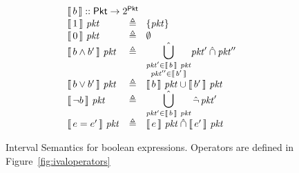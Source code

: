 \begin{figure}
  \[
    \begin{array}{lcl}
      \multicolumn 3 l {\bracbb{b} :: \Pkt \to 2^\Pkt} \\
      \bracbb{1}~\pkt &\triangleq& \{\pkt\}\\
      \bracbb{0}~\pkt & \triangleq & \emptyset \\
      \bracbb{b \wedge b'}~\pkt &\triangleq & \displaystyle \hat{\bigcup_{\substack{\pkt' \in \bracbb{b}~\pkt\\ \pkt'' \in \bracbb{b'}}}} \pkt' \icap \pkt''\\
      \bracbb{b \vee b'}~\pkt & \triangleq & \bracbb{b}~\pkt \cup \bracbb{b'}~\pkt \\
      \bracbb{\neg b}~\pkt & \triangleq & \displaystyle \hat{\bigcup_{\pkt' \in \bracbb{b}~\pkt}}\ineg \pkt'\\
      \bracbb{e = e'}~\pkt & \triangleq & \bracbb{e}~\pkt \icap \bracbb{e'}~\pkt
    \end{array}
  \]
  \caption{Interval Semantics for boolean expressions. Operators are
    defined in Figure~\ref{fig:ivaloperators}}
  \label{fig:expr_semantics}
\end{figure}
